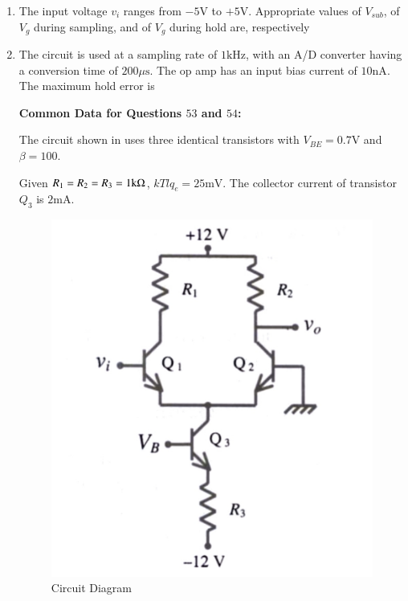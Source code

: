 \documentclass[journal,12pt,onecolumn]{IEEEtran}
\theoremstyle{remark}
\begin{document}
\begin{enumerate}
\item The input voltage $v_i$ ranges from $-5\text{V}$ to $+5\text{V}$. Appropriate values of $V_{sub}$, of $V_g$ during sampling, and of $V_g$ during hold are, respectively \par \hfill{}
\begin{enumerate}
\end{enumerate}

\item The circuit is used at a sampling rate of $1{\text{kHz}}$, with an A/D converter having a conversion time of $200{\mu}\text{s}$. The op amp has an input bias current of $10\text{nA}$. The maximum hold error is \par \hfill{}
\begin{enumerate}
\end{enumerate}

 

\textbf{Common Data for Questions $53$ and $54$:}\par
The circuit shown in  uses three identical transistors with $V_{BE}=0.7\text{V}$ and $\beta=100$. \par
Given $R_1=R_2=R_3=1\text{k}\ohm$, $kTlq_e=25\text{mV}$. The collector current of transistor $Q_3$ is $2\text{mA}$. 
\begin{figure}[H]
    \centering
    \includegraphics[width=0.5\columnwidth]{Figs/Q-53,54.jpg}
    \caption{Circuit Diagram}
    \label{fig:placeholder_16}
\end{figure}


\end{enumerate}
\end{document}
